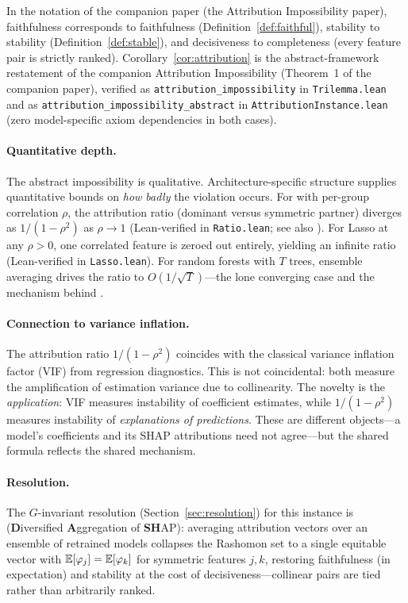 In the notation of the companion paper (the Attribution Impossibility paper), faithfulness
corresponds to faithfulness (Definition~\ref{def:faithful}), stability to stability
(Definition~\ref{def:stable}), and decisiveness to completeness (every feature pair is
strictly ranked).  Corollary~\ref{cor:attribution} is the abstract-framework restatement
of the companion Attribution Impossibility (Theorem~1 of the companion paper), verified as
\texttt{attribution\_impossibility} in \texttt{Trilemma.lean} and as
\texttt{attribution\_impossibility\_abstract} in \texttt{AttributionInstance.lean} (zero
model-specific axiom dependencies in both cases).

\paragraph{Quantitative depth.}
The abstract impossibility is qualitative.  Architecture-specific structure supplies
quantitative bounds on \emph{how badly} the violation occurs.  For \GBDT{} with
per-group correlation $\rho$, the attribution ratio (dominant versus symmetric partner)
diverges as $1/(1-\rho^2)$ as $\rho \to 1$ (Lean-verified in \texttt{Ratio.lean}; see
also \citet{damour2022underspecification}).  For Lasso at any $\rho > 0$, one correlated
feature is zeroed out entirely, yielding an infinite ratio
(Lean-verified in \texttt{Lasso.lean}).
For random forests with $T$ trees, ensemble averaging drives the ratio to
$O(1/\sqrt{T})$---the lone converging case and the mechanism behind \DASH{}.

\paragraph{Connection to variance inflation.}
The attribution ratio $1/(1{-}\rho^2)$ coincides with the classical variance inflation factor (VIF) from regression diagnostics. This is not coincidental: both measure the amplification of estimation variance due to collinearity. The novelty is the \emph{application}: VIF measures instability of coefficient estimates, while $1/(1{-}\rho^2)$ measures instability of \emph{explanations of predictions}. These are different objects---a model's coefficients and its SHAP attributions need not agree---but the shared formula reflects the shared mechanism.

\paragraph{Resolution.}
The $G$-invariant resolution (Section~\ref{sec:resolution}) for this instance is
\DASH{} (\textbf{D}iversified \textbf{A}ggregation of \textbf{SH}AP):
averaging attribution vectors over an ensemble of
retrained models collapses the Rashomon set to a single equitable vector with
$\mathbb{E}[\varphi_j] = \mathbb{E}[\varphi_k]$ for symmetric features $j, k$, restoring faithfulness
(in expectation) and stability at the cost of decisiveness---collinear pairs are tied
rather than arbitrarily ranked.

